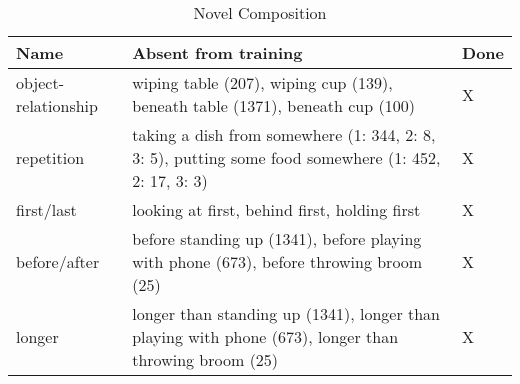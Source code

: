 \documentclass{article}
\begin{document}
\begin{longtable}[]{|p{2cm}|p{10cm}|p{.5cm}|}
    \caption{Novel Composition}
    \label{tab:table1}
    \hline
    \textbf{Name} & \textbf{Absent from training} & Done \\
    \hline
    object-relationship & wiping table (207), wiping cup (139), beneath table (1371), beneath cup (100) &X  \\
    \hline
    repetition & taking a dish from somewhere (1: 344, 2: 8, 3: 5), putting some food somewhere (1: 452, 2: 17, 3: 3) & X \\
    \hline
    first/last & looking at first, behind first, holding first & X \\
    \hline
    before/after & before standing up (1341), before playing with phone (673), before throwing broom (25) & X \\
    \hline
    longer & longer than standing up (1341), longer than playing with phone (673), longer than throwing broom (25) &  X\\
    \hline
    
\end{longtable}
\end{document}
